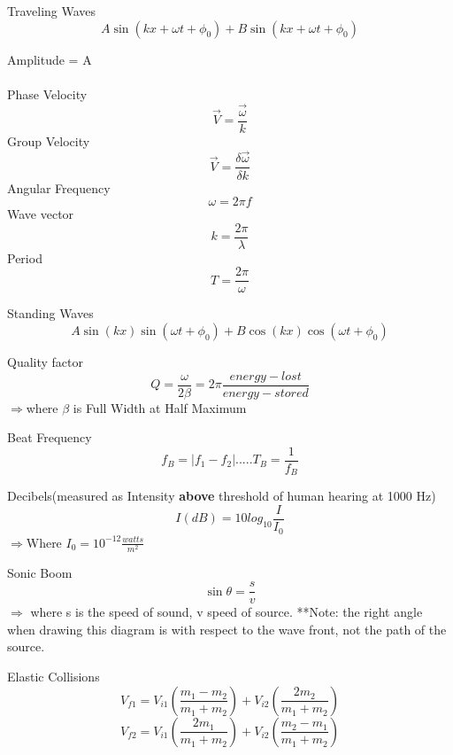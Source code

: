\documentclass{article}
\begin{document}
{Traveling Waves\begin{equation}A\sin(kx+\omega t + \phi_0)+B\sin(kx+\omega t +\phi_0)\end{equation}

Amplitude = A\\\\
Phase Velocity\begin{equation}\vec{V}=\frac{\vec{\omega}}{k}\end{equation}
Group Velocity\begin{equation}\vec{V}=\frac{\delta \vec{\omega}}{\delta k}\end{equation}
Angular Frequency\begin{equation}\omega = 2\pi f \end{equation}
Wave vector\begin{equation}k = \frac{2\pi}{\lambda}\end{equation}
Period\begin{equation} T = \frac{2\pi}{\omega}\end{equation}

Standing Waves\begin{equation}A\sin(kx)\sin(\omega t+\phi_0)+B\cos(kx)\cos(\omega t+\phi_0)\end{equation}

Quality factor\begin{equation}Q=\frac{\omega}{2\beta}=2\pi \frac{energy-lost}{energy-stored}\end{equation}
$\Rightarrow$where $\beta$ is Full Width at Half Maximum

Beat Frequency\begin{equation}f_B=|f_1-f_2|.....T_B = \frac{1}{f_B}\end{equation}

Decibels(measured as Intensity {\bf above} threshold of human hearing at 1000 Hz)\begin{equation}I(dB)=10log_{10}\frac{I}{I_0}\end{equation}
$\Rightarrow$Where $I_0 = 10^{-12} \frac{watts}{m^2}$

Sonic Boom\begin{equation}\sin{\theta} = \frac{s}{v}\end{equation}
$\Rightarrow$ where s is the speed of sound, v speed of source.  **Note: the right angle when drawing this diagram is with respect to the wave front, not the path of the source.

Elastic Collisions\begin{equation}V_{f1}=V_{i1}(\frac{m_1-m_2}{m_1+m_2})+V_{i2}(\frac{2m_2}{m_1+m_2})\end{equation}
\begin{equation}V_{f2}=V_{i1}(\frac{2m_1}{m_1+m_2})+V_{i2}(\frac{m_2-m_1}{m_1+m_2})\end{equation}

}
\end{document}
